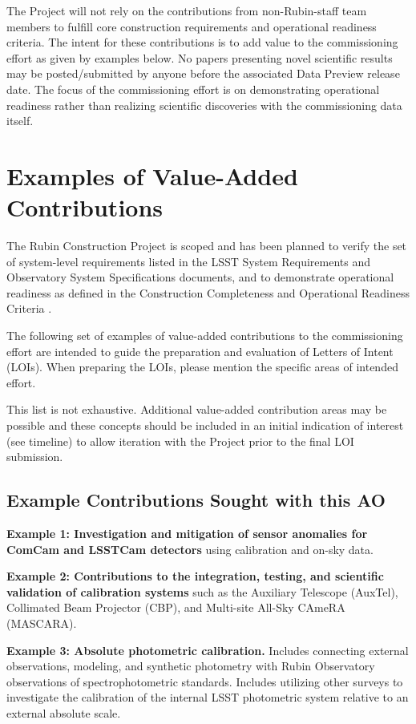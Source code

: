 \documentclass[SE,authoryear,toc,lsstdraft]{lsstdoc}
\begin{document}
The Project will not rely on the contributions from non-Rubin-staff team members to fulfill core construction requirements and operational readiness criteria. The intent for these contributions is to add value to the commissioning effort as given by examples below.  No papers presenting novel scientific results may be posted/submitted by anyone before the associated Data Preview release date. The focus of the commissioning effort is on demonstrating operational readiness rather than realizing scientific discoveries with the commissioning data itself.

\section{Examples of Value-Added Contributions}
\label{examples}

The Rubin Construction Project is scoped and has been planned to verify the set of system-level requirements listed in the LSST System Requirements  and Observatory System Specifications  documents, and to demonstrate operational readiness as defined in the Construction Completeness and Operational Readiness Criteria . 

The following set of examples of value-added contributions to the commissioning effort are intended to guide the preparation and evaluation of Letters of Intent (LOIs). When preparing the LOIs, please mention the specific areas of intended effort. 

This list is not exhaustive. Additional value-added contribution areas may be possible and these concepts should be included in an initial indication of interest (see timeline) to allow iteration with the Project prior to the final LOI submission.

\subsection{Example Contributions Sought with this AO}

\textbf{Example 1: Investigation and mitigation of sensor anomalies for ComCam and LSSTCam detectors} using calibration and on-sky data.

\textbf{Example 2: Contributions to the integration, testing, and scientific validation of calibration systems} such as the Auxiliary Telescope (AuxTel), Collimated Beam Projector (CBP), and Multi-site All-Sky CAmeRA (MASCARA).

\textbf{Example 3: Absolute photometric calibration.} Includes connecting external observations, modeling, and synthetic photometry with Rubin Observatory observations of  spectrophotometric standards. Includes utilizing other surveys to investigate the calibration of the internal LSST photometric system relative to an external absolute scale.
\end{document}

